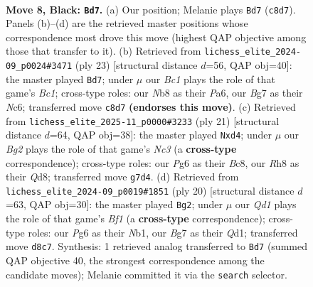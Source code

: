 \documentclass[11pt]{article}
\begin{document}
\clearpage

\begin{figure}[p]\centering
\begin{subfigure}{0.46\textwidth}\centering
\resizebox{\linewidth}{!}{%
\newchessgame
\chessboard[
  setfen={rnbqk2r/pp2ppbp/3p2p1/7n/3NP3/2N1BP2/PPPQ2PP/R3KB1R b KQkq - 2 8},
  showmover=false,
  pgfstyle=straightmove, color=movearrow, markmove={c8-d7}
]}
\caption{}
\end{subfigure}\hfill
\begin{subfigure}{0.46\textwidth}\centering
\resizebox{\linewidth}{!}{%
\newchessgame
\chessboard[
  setfen={r1bqk2r/1p2ppb1/p1np2p1/6Pn/3NP3/2N1B3/PPPQ1P2/R3KBR1 b Qkq - 2 12},
  showmover=false,
  pgfstyle=straightmove, color=movearrow, markmove={c8-d7}
]}
\caption{}
\end{subfigure}
\\[4pt]
\begin{subfigure}{0.46\textwidth}\centering
\resizebox{\linewidth}{!}{%
\newchessgame
\chessboard[
  setfen={r1bq1rnk/ppp2pbp/2np2p1/8/2BNP3/P1N1B2P/1PPQ1PP1/R3K2R b KQ - 0 11},
  showmover=false,
  pgfstyle=straightmove, color=movearrow, markmove={c6-d4}
]}
\caption{}
\end{subfigure}\hfill
\begin{subfigure}{0.46\textwidth}\centering
\resizebox{\linewidth}{!}{%
\newchessgame
\chessboard[
  setfen={rnbqk2r/1p2bppp/p4n2/4p3/2Pp4/1P4P1/PBN1PP1P/RN1QKB1R w KQkq - 0 11},
  showmover=false,
  pgfstyle=straightmove, color=movearrow, markmove={f1-g2}
]}
\caption{}
\end{subfigure}
\caption{\textbf{Move 8, Black: \texttt{Bd7}.} (a) Our position; Melanie plays \texttt{Bd7} (\texttt{c8d7}). Panels (b)--(d) are the retrieved master positions whose correspondence most drove this move (highest QAP objective among those that transfer to it). (b) Retrieved from \texttt{lichess\_elite\_2024-09\_p0024\#3471} (ply 23) [structural distance $d$=56, QAP obj=40]: the master played \texttt{Bd7}; under $\mu$ our \emph{Bc1} plays the role of that game's \emph{Bc1}; cross-type roles: our \emph{N}b8 as their \emph{P}a6, our \emph{B}g7 as their \emph{N}c6; transferred move \texttt{c8d7} \textbf{(endorses this move)}. (c) Retrieved from \texttt{lichess\_elite\_2025-11\_p0000\#3233} (ply 21) [structural distance $d$=64, QAP obj=38]: the master played \texttt{Nxd4}; under $\mu$ our \emph{Bg2} plays the role of that game's \emph{Nc3} (a \textbf{cross-type} correspondence); cross-type roles: our \emph{P}g6 as their \emph{B}c8, our \emph{R}h8 as their \emph{Q}d8; transferred move \texttt{g7d4}. (d) Retrieved from \texttt{lichess\_elite\_2024-09\_p0019\#1851} (ply 20) [structural distance $d$=63, QAP obj=30]: the master played \texttt{Bg2}; under $\mu$ our \emph{Qd1} plays the role of that game's \emph{Bf1} (a \textbf{cross-type} correspondence); cross-type roles: our \emph{P}g6 as their \emph{N}b1, our \emph{B}g7 as their \emph{Q}d1; transferred move \texttt{d8c7}. Synthesis: 1 retrieved analog transferred to \texttt{Bd7} (summed QAP objective 40, the strongest correspondence among the candidate moves); Melanie committed it via the \texttt{search} selector.}
\label{fig:thought-m15}
\end{figure}
\end{document}
